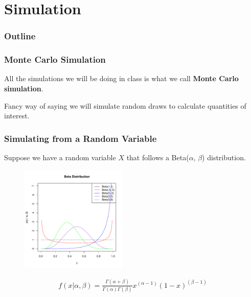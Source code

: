\documentclass{beamer}
\begin{document}
\section{Simulation}

\begin{frame}
\frametitle{Outline}
\tableofcontents[currentsection]
\end{frame}

\begin{frame}
\frametitle{Monte Carlo Simulation}
\pause
All the simulations we will be doing in class is what we call
\textbf{Monte Carlo simulation}.
\pause
\begin{figure}[!htp]
\end{figure}
\pause
Fancy way of saying we will simulate random draws to calculate
quantities of interest.
\end{frame}

\begin{frame}
\frametitle{Simulating from a Random Variable}
\pause
Suppose we have a random variable $X$ that follows a Beta($\alpha$,
$\beta$) distribution.
\pause
\begin{figure}[!htp]
\begin{center}
\includegraphics[width=2in, height=2in]{probability-beta.pdf}
\end{center}
\end{figure}
\pause
\begin{eqnarray*}
f(x| \alpha, \beta) = \frac{\Gamma (\alpha + \beta)}{\Gamma (\alpha)
\Gamma (\beta)} x^{(\alpha - 1)} (1 - x)^{(\beta-1)}\\
\end{eqnarray*}
\end{frame}
\end{document}
